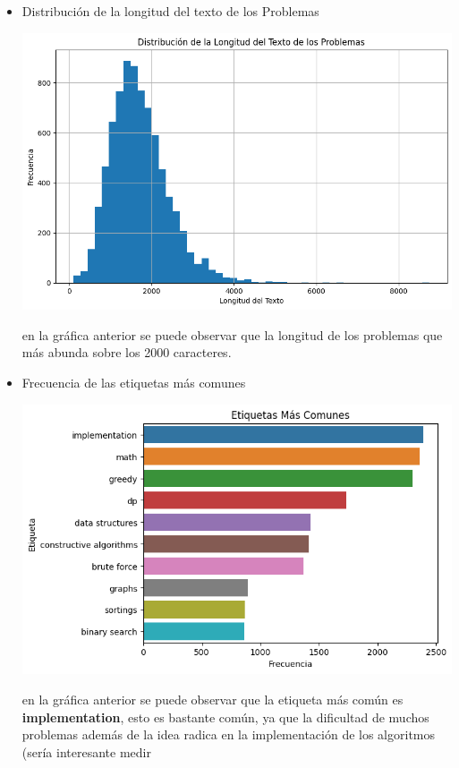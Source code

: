 \documentclass{article}
\begin{document}
\begin{itemize}
    \item Distribución de la longitud del texto de los Problemas
          \begin{center}
              \includegraphics[scale=0.8]{imgs/len_description.png}
          \end{center}
          en la gráfica anterior se puede observar que la longitud de los problemas que más abunda sobre los 2000 caracteres.
          \newpage          
    \item Frecuencia de las etiquetas más comunes
          \begin{center}
              \includegraphics[scale=0.8]{imgs/common_tags_count.png}
          \end{center}
          en la gráfica anterior se puede observar que la etiqueta más común es \textbf{implementation}, esto es bastante común, ya
          que la dificultad de muchos problemas además de la idea radica en la implementación de los algoritmos (sería interesante medir

\end{itemize}
\end{document}
